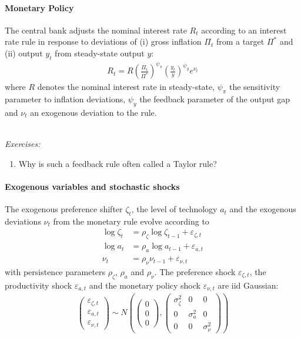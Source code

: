 \paragraph{Monetary Policy}
The central bank adjusts the nominal interest rate $R_t$ according to an interest rate rule
  in response to deviations of (i) gross inflation $\Pi_t$ from a target $\Pi^*$
  and (ii) output $y_t$ from steady-state output $y$:
\begin{align}
R_t = R \left(\frac{\Pi_t}{\Pi^*}\right)^{\psi_\pi} \left(\frac{y_t}{y}\right)^{\psi_y} e^{\nu_t} \label{eq:NewKeynesian.MonetaryPolicyRule}
\end{align}
where $R$ denotes the nominal interest rate in steady-state,
  $\psi_\pi$ the sensitivity parameter to inflation deviations,
  $\psi_y$ the feedback parameter of the output gap
  and $\nu_t$ an exogenous deviation to the rule.

~\\\noindent\emph{Exercises:}
\begin{enumerate}[resume]
\item Why is such a feedback rule often called a Taylor rule?
\end{enumerate}

\paragraph{Exogenous variables and stochastic shocks}
The exogenous preference shifter $\zeta_t$, the level of technology $a_t$
  and the exogenous deviations $\nu_t$ from the monetary rule evolve according to
\begin{align}
\log{\zeta_t} &= \rho_\zeta \log{\zeta_{t-1}} + \varepsilon_{\zeta,t} \label{eq:NewKeynesian.LoM.PreferenceShifter}\\
\log{a_t} &= \rho_a \log{a_{t-1}} + \varepsilon_{a,t} \label{eq:NewKeynesian.LoM.TFP}\\
\nu_t &= \rho_\nu \nu_{t-1} + \varepsilon_{\nu,t} \label{eq:NewKeynesian.LoM.MonPol}
\end{align}
with persistence parameters $\rho_\zeta$, $\rho_a$ and $\rho_\nu$.
The preference shock $\varepsilon_{\zeta,t}$, the productivity shock $\varepsilon_{a,t}$
  and the monetary policy shock $\varepsilon_{\nu,t}$ are iid Gaussian:
\begin{align*}
\begin{pmatrix}
\varepsilon_{\zeta,t}\\\varepsilon_{a,t}\\\varepsilon_{\nu,t}
\end{pmatrix}
\sim N\left(\begin{pmatrix} 0\\0\\0\end{pmatrix}, \begin{pmatrix} \sigma_\zeta^2 & 0& 0\\0 & \sigma_{a}^2& 0\\0 & 0 & \sigma_{\nu}^2\end{pmatrix}\right)
\end{align*}

